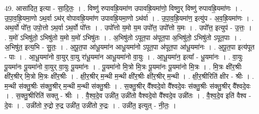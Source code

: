 \documentclass[17pt]{extarticle}
\begin{document}
49. आसा॑दित॒ इत्या - सा॒दि॒तः॒ । . विष्णु॑ रुपावह्रि॒यमा॑ण उपावह्रि॒यमा॑णो॒ विष्णु॒र् विष्णु॑ रुपावह्रि॒यमा॑णः । . उ॒पा॒व॒ह्रि॒यमा॒णो ऽथ॒र्वा ऽथ॑र् वोपावह्रि॒यमा॑ण उपावह्रि॒यमा॒णो ऽथ॑र्वा । . उ॒पा॒व॒ह्रि॒यमा॑ण॒ इत्यु॑प - अ॒व॒ह्रि॒यमा॑णः । . अथ॒र्वो पो᳚त्त॒ उपो॒त्तो ऽथ॒र्वा ऽथ॒र्वो पो᳚त्तः । . उपो᳚त्तो य॒मो य॒म उपो᳚त्त॒ उपो᳚त्तो य॒मः । . उपो᳚त्त॒ इत्युप॑ - उ॒त्तः॒ । . य॒मो॑ ऽभिषु॑तो॒ ऽभिषु॑तो य॒मो य॒मो॑ ऽभिषु॑तः । . अ॒भिषु॑तो ऽपूत॒पा अ॑पूत॒पा अ॒भिषु॑तो॒ ऽभिषु॑तो ऽपूत॒पाः । . अ॒भिषु॑त॒ इत्य॒भि - सु॒तः॒ । . अ॒पू॒त॒पा आ॑धू॒यमा॑न आधू॒यमा॑नो ऽपूत॒पा अ॑पूत॒पा आ॑धू॒यमा॑नः । . अ॒पू॒त॒पा इत्य॑पूत - पाः । . आ॒धू॒यमा॑नो वा॒युर् वा॒यु रा॑धू॒यमा॑न आधू॒यमा॑नो वा॒युः । . आ॒धू॒यमा॑न॒ इत्या᳚ - धू॒यमा॑नः । . वा॒युः पू॒यमा॑नः पू॒यमा॑नो वा॒युर् वा॒युः पू॒यमा॑नः । . पू॒यमा॑नो मि॒त्रो मि॒त्रः पू॒यमा॑नः पू॒यमा॑नो मि॒त्रः । . मि॒त्रः क्षी॑र॒श्रीः क्षी॑र॒श्रीर् मि॒त्रो मि॒त्रः क्षी॑र॒श्रीः । . क्षी॒र॒श्रीर् म॒न्थी म॒न्थी क्षी॑र॒श्रीः क्षी॑र॒श्रीर् म॒न्थी । . क्षी॒र॒श्रीरिति॑ क्षीर - श्रीः । . म॒न्थी स॑क्तु॒श्रीः स॑क्तु॒श्रीर् म॒न्थी म॒न्थी स॑क्तु॒श्रीः । . स॒क्तु॒श्रीर् वै᳚श्वदे॒वो वै᳚श्वदे॒वः स॑क्तु॒श्रीः स॑क्तु॒श्रीर् वै᳚श्वदे॒वः । . स॒क्तु॒श्रीरिति॑ सक्तु - श्रीः । . वै॒श्व॒दे॒व उन्नी॑त॒ उन्नी॑तो वैश्वदे॒वो वै᳚श्वदे॒व उन्नी॑तः । . वै॒श्व॒दे॒व इति॑ वैश्व - दे॒वः । . उन्नी॑तो रु॒द्रो रु॒द्र उन्नी॑त॒ उन्नी॑तो रु॒द्रः । . उन्नी॑त॒ इत्युत् - नी॒तः॒ । \newline
\end{document}
